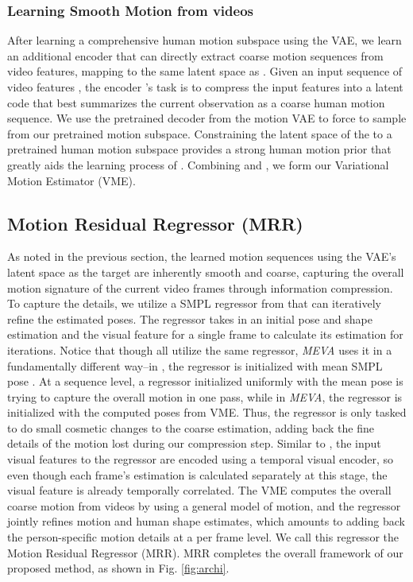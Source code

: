 \documentclass[runningheads]{llncs}
\begin{document}
\subsubsection{Learning Smooth Motion from videos}
After learning a comprehensive human motion subspace using the VAE, we learn an additional encoder  that can directly extract coarse motion sequences from video features, mapping to the same latent space as . Given an input sequence of video features , the encoder 's task is to compress the input features into a latent code  that best summarizes the current observation as a coarse human motion sequence. We use the pretrained decoder  from the motion VAE to force  to sample from our pretrained motion subspace. Constraining the latent space of the  to a pretrained human motion subspace provides a strong human motion prior that greatly aids the learning process of . Combining  and , we form our Variational Motion Estimator (VME). 

\subsection{Motion Residual Regressor (MRR)}
As noted in the previous section, the learned motion sequences using the VAE's latent space as the target are inherently smooth and coarse,  capturing the overall motion signature of the current video frames through information compression. To capture the details, we utilize a SMPL regressor from \cite{hmr} that can iteratively refine the estimated poses. The regressor takes in an initial pose and shape estimation  and the visual feature  for a single frame to calculate its estimation  for  iterations. Notice that though \cite{hmr,hmmr,vibe,spin} all utilize the same regressor, \textit{MEVA} uses it in a fundamentally different way--in \cite{hmr,hmmr,vibe,spin}, the regressor is initialized with mean SMPL pose . At a sequence level, a regressor initialized uniformly with the mean pose  is trying to capture the overall motion in one pass, while in \textit{MEVA}, the regressor is initialized with the computed poses from VME. Thus, the regressor is only tasked to do small cosmetic changes to the coarse estimation, adding back the fine details of the motion lost during our compression step. Similar to \cite{vibe}, the input visual features  to the regressor are encoded using a temporal visual encoder, so even though each frame's estimation is calculated separately at this stage, the visual feature is already temporally correlated. The VME computes the overall coarse motion from videos by using a general model of motion, and the regressor jointly refines motion and human shape estimates, which amounts to adding back the person-specific motion details at a per frame level. We call this regressor the Motion Residual Regressor (MRR). MRR completes the overall framework of our proposed method, as shown in Fig. \ref{fig:archi}.
\end{document}
